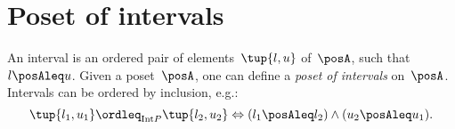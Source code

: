 

\section{Poset of intervals}
\begin{definition}
  \label{def:poset_intervals}
  An interval is an ordered pair of elements~$\tup{l,u}$ of~$\posA$, such that~$l\posAleq u$. Given a poset~$\posA$, one can define a \emph{poset of intervals} on~$\posA$. Intervals can be ordered by inclusion, e.g.:
  \begin{equation*}
    \tup{l_1,u_1}\ordleq_{\mathrm{Int} P}\tup{l_2,u_2} \Leftrightarrow (l_1\posAleq l_2)\wedge (u_2\posAleq u_1).
  \end{equation*}
\end{definition}
